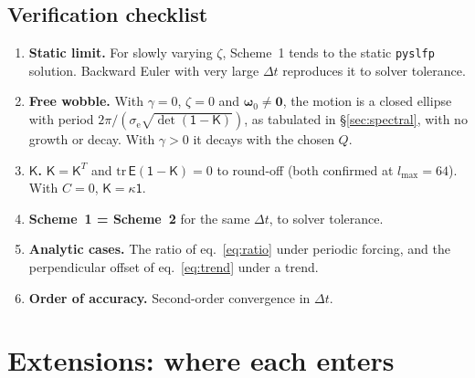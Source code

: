 \documentclass[11pt,a4paper]{article}
\newcommand{\bw}{\bm{\omega}}
\newcommand{\E}{\mathsf{E}}
\newcommand{\Id}{\mathsf{1}}
\newcommand{\K}{\mathsf{K}}
\newcommand{\se}{\sigma_{\mathrm e}}
\begin{document}
\subsection{Verification checklist}
\label{sec:checks}

\begin{enumerate}
  \item \textbf{Static limit.} For slowly varying $\zeta$, Scheme~1 tends to the static
  \texttt{pyslfp} solution. Backward Euler with very large $\Delta t$ reproduces it to solver
  tolerance.
  \item \textbf{Free wobble.} With $\gamma=0$, $\zeta=0$ and $\bw_0\neq\mathbf{0}$, the motion is a
  closed ellipse with period $2\pi/(\se\sqrt{\det(\Id-\K)})$, as tabulated in \S\ref{sec:spectral},
  with no growth or decay. With $\gamma>0$ it decays with the chosen $Q$.
  \item \textbf{$\K$.} $\K=\K^T$ and $\mathrm{tr}\,\E(\Id-\K)=0$ to round-off (both confirmed at
  $l_{\max}=64$). With $C=0$, $\K=\kappa\Id$.
  \item \textbf{Scheme~1 = Scheme~2} for the same $\Delta t$, to solver tolerance.
  \item \textbf{Analytic cases.} The ratio of eq.~\eqref{eq:ratio} under periodic forcing, and the
  perpendicular offset of eq.~\eqref{eq:trend} under a trend.
  \item \textbf{Order of accuracy.} Second-order convergence in $\Delta t$.
\end{enumerate}

\section{Extensions: where each enters}
\label{sec:ext}
\end{document}

